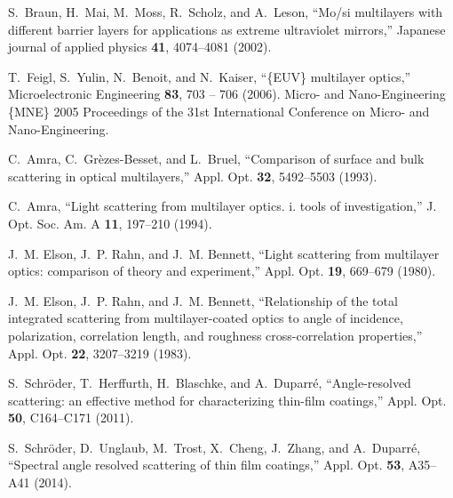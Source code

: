 \documentclass[twocolumn,osajnl,showpacs,superscriptaddress,11pt]{revtex4-1}
\begin{document}


\begin{thebibliography}{10}
\newcommand{\enquote}[1]{``#1''}

S.~Braun, H.~Mai, M.~Moss, R.~Scholz, and A.~Leson, \enquote{Mo/si multilayers
  with different barrier layers for applications as extreme ultraviolet
  mirrors,} Japanese journal of applied physics \textbf{41}, 4074--4081 (2002).

T.~Feigl, S.~Yulin, N.~Benoit, and N.~Kaiser, \enquote{\{EUV\} multilayer
  optics,} Microelectronic Engineering \textbf{83}, 703 -- 706 (2006). Micro-
  and Nano-Engineering \{MNE\} 2005 Proceedings of the 31st International
  Conference on Micro- and Nano-Engineering.

C.~Amra, C.~Gr\`{e}zes-Besset, and L.~Bruel, \enquote{Comparison of surface and
  bulk scattering in optical multilayers,} Appl. Opt. \textbf{32}, 5492--5503
  (1993).

C.~Amra, \enquote{Light scattering from multilayer optics. i. tools of
  investigation,} J. Opt. Soc. Am. A \textbf{11}, 197--210 (1994).

J.~M. Elson, J.~P. Rahn, and J.~M. Bennett, \enquote{Light scattering from
  multilayer optics: comparison of theory and experiment,} Appl. Opt.
  \textbf{19}, 669--679 (1980).

J.~M. Elson, J.~P. Rahn, and J.~M. Bennett, \enquote{Relationship of the total
  integrated scattering from multilayer-coated optics to angle of incidence,
  polarization, correlation length, and roughness cross-correlation
  properties,} Appl. Opt. \textbf{22}, 3207--3219 (1983).

S.~Schr\"{o}der, T.~Herffurth, H.~Blaschke, and A.~Duparr\'{e},
  \enquote{Angle-resolved scattering: an effective method for characterizing
  thin-film coatings,} Appl. Opt. \textbf{50}, C164--C171 (2011).

S.~Schr\"{o}der, D.~Unglaub, M.~Trost, X.~Cheng, J.~Zhang, and A.~Duparr\'{e},
  \enquote{Spectral angle resolved scattering of thin film coatings,} Appl.
  Opt. \textbf{53}, A35--A41 (2014).


\end{thebibliography}
\end{document}
